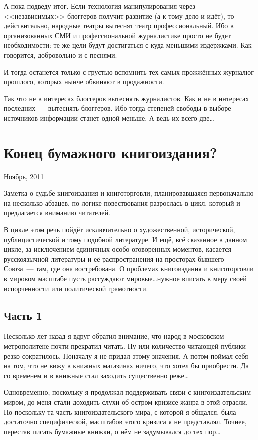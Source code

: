 А пока подведу итог. Если технология манипулирования через <<независимых>> блоггеров получит развитие (а к тому дело и идёт), то действительно, народные театры вытеснят театр профессиональный. Ибо в организованных СМИ и профессиональной журналистике просто не будет необходимости: те же цели будут достигаться с куда меньшими издержками. Как говорится, добровольно и с песнями.

И тогда останется только с грустью вспомнить тех самых прожжённых журналюг прошлого, которых нынче обвиняют в продажности.

Так что не в интересах блоггеров вытеснять журналистов. Как и не в интересах последних~--- вытеснять блоггеров. Ибо тогда степеней свободы в выборе источников информации станет одной меньше. А ведь их всего две\dots

\section{Конец бумажного книгоиздания?} 
\begin{timeline}Ноябрь, 2011\end{timeline}
Заметка о судьбе книгоиздания и книготорговли, планировавшаяся первоначально на несколько абзацев, по логике повествования разрослась в цикл, который и предлагается вниманию читателей.

В цикле этом речь пойдёт исключительно о художественной, исторической, публицистической и тому подобной литературе. И ещё, всё сказанное в данном цикле, за исключением единичных особо оговоренных моментов, касается русскоязычной литературы и её распространения на просторах бывшего Союза~--- там, где она востребована. О проблемах книгоиздания и книготорговли в мировом масштабе пусть рассуждают мировые\dots нужное вписать в меру своей испорченности или политической грамотности.

\subsection{Часть 1}
Несколько лет назад я вдруг обратил внимание, что народ в московском метрополитене почти прекратил читать. Ну или количество читающей публики резко сократилось. Поначалу я не придал этому значения. А потом поймал себя на том, что не вижу в книжных магазинах ничего, что хотел бы приобрести. Да со временем и в книжные стал заходить существенно реже\dots

Одновременно, поскольку я продолжал поддерживать связи с книгоиздательским миром, до меня стали доходить слухи об остром кризисе жанра в этой отрасли. Но поскольку та часть книгоиздательского мира, с которой я общался, была достаточно специфической, масштабов этого кризиса я не представлял. Точнее, перестав писать бумажные книжки, о нём не задумывался до тех пор\dots

